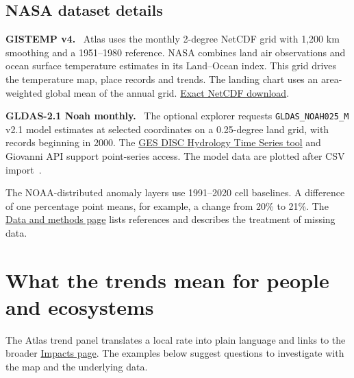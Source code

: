 \documentclass[11pt,letterpaper]{article}
\newcommand{\note}[1]{\par\medskip\noindent #1\par\medskip}
\begin{document}
\subsection*{NASA dataset details}
\textbf{GISTEMP v4.}~\cite{gistemp,lenssen} Atlas uses the monthly 2-degree NetCDF grid with 1,200 km smoothing and a 1951--1980 reference. NASA combines land air observations and ocean surface temperature estimates in its Land--Ocean index. This grid drives the temperature map, place records and trends. The landing chart uses an area-weighted global mean of the annual grid. \href{https://data.giss.nasa.gov/pub/gistemp/gistemp1200_GHCNv4_ERSSTv5.nc.gz}{Exact NetCDF download}.

\textbf{GLDAS-2.1 Noah monthly.}~\cite{gldas} The optional explorer requests \texttt{GLDAS\_NOAH025\_M} v2.1 model estimates at selected coordinates on a 0.25-degree land grid, with records beginning in 2000. The \href{https://disc.gsfc.nasa.gov/information/tools?title=Hydrology%20Time%20Series}{GES DISC Hydrology Time Series tool} and Giovanni API support point-series access. The model data are plotted after CSV import~\cite{nasa-hydrology}.

\note{The NOAA-distributed anomaly layers use 1991--2020 cell baselines. A difference of one percentage point means, for example, a change from 20\% to 21\%. The \href{https://gqatlas.vercel.app/data-and-methods/}{Data and methods page} lists references and describes the treatment of missing data.}


\clearpage
\section{What the trends mean for people and ecosystems}
The Atlas trend panel translates a local rate into plain language and links to the broader \href{https://gqatlas.vercel.app/impacts/}{Impacts page}. The examples below suggest questions to investigate with the map and the underlying data.
\end{document}
